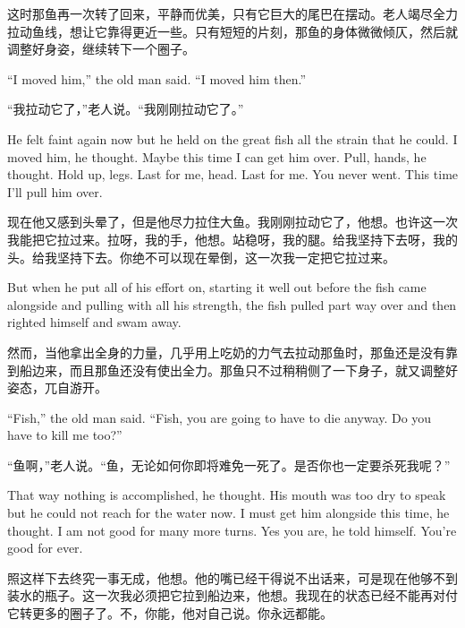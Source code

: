 \begin{paracol}{2}
\switchcolumn

这时那鱼再一次转了回来，平静而优美，只有它巨大的尾巴在摆动。老人竭尽全力拉动鱼线，想让它靠得更近一些。只有短短的片刻，那鱼的身体微微倾仄，然后就调整好身姿，继续转下一个圈子。

\switchcolumn*

``I moved him,'' the old man said. ``I moved him then.''

\switchcolumn

“我拉动它了，”老人说。“我刚刚拉动它了。”

\switchcolumn*

He felt faint again now but he held on the great fish all the strain that he
could. I moved him, he thought. Maybe this time I can get him over. Pull,
hands, he thought. Hold up, legs. Last for me, head. Last for me. You never
went. This time I'll pull him over.

\switchcolumn

现在他又感到头晕了，但是他尽力拉住大鱼。我刚刚拉动它了，他想。也许这一次我能把它拉过来。拉呀，我的手，他想。站稳呀，我的腿。给我坚持下去呀，我的头。给我坚持下去。你绝不可以现在晕倒，这一次我一定把它拉过来。

\switchcolumn*

But when he put all of his effort on, starting it well out before the fish
came alongside and pulling with all his strength, the fish pulled part way
over and then righted himself and swam away.

\switchcolumn

然而，当他拿出全身的力量，几乎用上吃奶的力气去拉动那鱼时，那鱼还是没有靠到船边来，而且那鱼还没有使出全力。那鱼只不过稍稍侧了一下身子，就又调整好姿态，兀自游开。

\switchcolumn*

``Fish,'' the old man said. ``Fish, you are going to have to die anyway. Do
you have to kill me too?''

\switchcolumn

“鱼啊，”老人说。“鱼，无论如何你即将难免一死了。是否你也一定要杀死我呢？”

\switchcolumn*

That way nothing is \gls{accomplished}, he thought. His mouth was too dry to
speak but he could not reach for the water now. I must get him alongside
this time, he thought. I am not good for many more turns. Yes you are, he
told himself. You're good for ever.

\switchcolumn

照这样下去终究一事无成，他想。他的嘴已经干得说不出话来，可是现在他够不到装水的瓶子。这一次我必须把它拉到船边来，他想。我现在的状态已经不能再对付它转更多的圈子了。不，你能，他对自己说。你永远都能。


\end{paracol}
